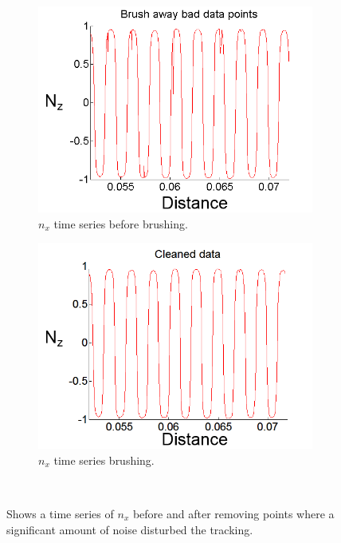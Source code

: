 \begin{figure}[H]
\centering
\begin{subfigure}[3a]{0.40\textwidth}
\includegraphics[width=\textwidth]{figures/method/Brushing1.png}
\caption{$n_x$ time series before brushing.}\label{fig:prebrush}
\end{subfigure}\hspace{1em}%
\begin{subfigure}[3b]{0.40\textwidth}
\includegraphics[width=\textwidth]{figures/method/Brushing2.png}
\caption{$n_x$ time series brushing.}\label{fig:postbrush}
\end{subfigure} \\
\caption{Shows a time series of $n_x$ before and after removing points where a significant amount of noise disturbed the tracking. } \label{fig:brushed}
\end{figure}
